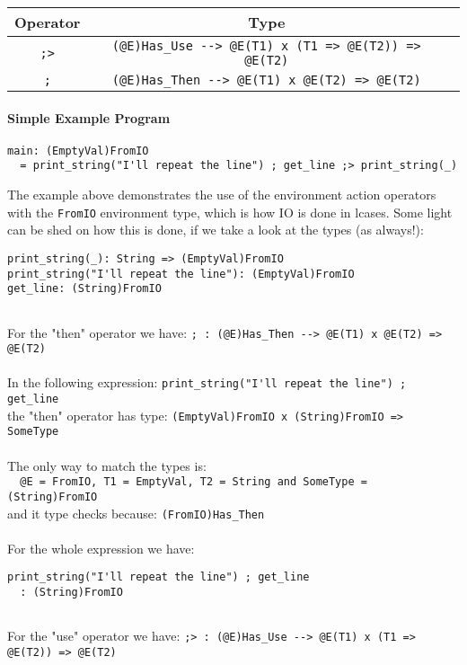 \documentclass[diploma]{softlab-thesis}
\begin{document}
\begin{center}
\begin{tabular}{ |c|c|c| }
\hline
Operator & Type
\\
\hline
\hline
\verb|;>| & \verb|(@E)Has_Use --> @E(T1) x (T1 => @E(T2)) => @E(T2)|
\\
\hline
\verb|;| & \verb|(@E)Has_Then --> @E(T1) x @E(T2) => @E(T2)|
\\
\hline
\end{tabular}
\end{center}

\paragraph{Simple Example Program}
\begin{verbatim}
main: (EmptyVal)FromIO
  = print_string("I'll repeat the line") ; get_line ;> print_string(_)
\end{verbatim}
The example above demonstrates the use of the environment action operators with
the \verb|FromIO| environment type, which is how IO is done in lcases. Some
light can be shed on how this is done, if we take a look at the types (as
always!):
\begin{verbatim}
print_string(_): String => (EmptyVal)FromIO
print_string("I'll repeat the line"): (EmptyVal)FromIO
get_line: (String)FromIO


\end{verbatim}
For the "then" operator we have:
\verb|; : (@E)Has_Then --> @E(T1) x @E(T2) => @E(T2)|
\\\\
In the following expression:
\verb|print_string("I'll repeat the line") ; get_line|
\\
the "then" operator has type:
\verb|(EmptyVal)FromIO x (String)FromIO => SomeType|
\\\\
The only way to match the types is:
\\
\verb|  @E = FromIO, T1 = EmptyVal, T2 = String and SomeType = (String)FromIO|
\\
and it type checks because: \verb|(FromIO)Has_Then|
\\\\
For the whole expression we have:
\begin{verbatim}
print_string("I'll repeat the line") ; get_line
  : (String)FromIO


\end{verbatim}
For the "use" operator we have:
\verb|;> : (@E)Has_Use --> @E(T1) x (T1 => @E(T2)) => @E(T2)|
\end{document}
